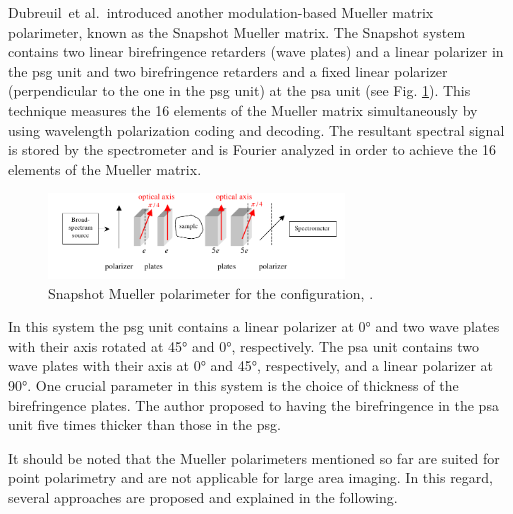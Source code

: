 Dubreuil~et al.\,\cite{dubreuil2007snapshot} introduced another modulation-based Mueller matrix polarimeter, known as the Snapshot Mueller matrix.
The Snapshot system contains two linear birefringence retarders (wave plates) and a linear polarizer in the \ac{psg} unit and two birefringence retarders and a fixed linear polarizer (perpendicular to the one in the \ac{psg} unit) at the \ac{psa} unit (see Fig. \ref{fig:snaphotMueller}).
This technique measures the 16 elements of the Mueller matrix simultaneously by using wavelength polarization coding and decoding.
The resultant spectral signal is stored by the spectrometer and is Fourier analyzed in order to achieve the 16 elements of the Mueller matrix. 
	\begin{figure}
	\centering 
	\includegraphics[width = 0.7\textwidth]{Chapter4/Figures/snapshotMueller.png}	
	\caption{ Snapshot Mueller polarimeter for the configuration, \cite{dubreuil2007snapshot}. }
	\label{fig:snaphotMueller}
	\end{figure}
\noindent In this system the \ac{psg} unit contains a linear polarizer at \ang{0} and two wave plates with their axis rotated at \ang{45} and \ang{0}, respectively.
The \ac{psa} unit contains two wave plates with their axis at \ang{0} and \ang{45}, respectively, and a linear polarizer at \ang{90}. 
One crucial parameter in this system is the choice of thickness of the birefringence plates.
The author proposed to having the birefringence in the \ac{psa} unit five times thicker than those in the \ac{psg}.

It should be noted that the Mueller polarimeters mentioned so far are suited for point polarimetry and are not applicable for large area imaging.
In this regard, several approaches are proposed and explained in the following.


